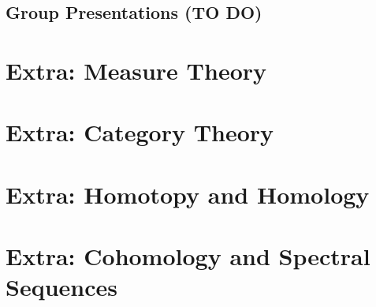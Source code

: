 \documentclass[11pt]{article}
\begin{document}



\subsection{Group Presentations (TO DO)}





\newpage
\section{Extra: Measure Theory}

\newpage
\section{Extra: Category Theory}


\newpage
\section{Extra: Homotopy and Homology}


\newpage
\section{Extra: Cohomology and Spectral Sequences}





\newpage
\vskip 0.5cm
\end{document}
